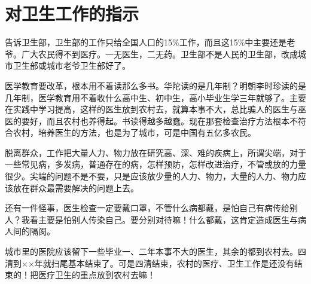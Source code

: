 \section[对卫生工作的指示（一九六五年六月二十六日）]{对卫生工作的指示}


告诉卫生部，卫生部的工作只给全国人口的15$\%$工作，而且这15$\%$中主要还是老爷。广大农民得不到医疗。一无医生，二无药。卫生部不是人民的卫生部，改成城市卫生部或城市老爷卫生部好了。

医学教育要改革，根本用不着读那么多书。华陀读的是几年制？明朝李时珍读的是几年制，医学教育用不着收什么高中生、初中生，高小毕业生学三年就够了。主要在实践中学习提高，这样的医生放到农村去，就算本事不大，总比骗人的医生与巫医的要好，而且农村也养得起。书读得越多越蠢。现在那套检查治疗方法根本不符合农村，培养医生的方法，也是为了城市，可是中国有五亿多农民。

脱离群众，工作把大量人力、物力放在研究高、深、难的疾病上，所谓尖端，对于一些常见病，多发病，普通存在的病，怎样预防，怎样改进治疗，不管或放的力量很少。尖端的问题不是不要，只是应该放少量的人力、物力，大量的人力、物力应该放在群众最需要解决的问题上去。

还有一件怪事，医生检查一定要戴口罩，不管什么病都戴，是怕自己有病传给别人？我看主要是怕别人传染自己。要分别对待嘛！什么都戴，这肯定造成医生与病人间的隔阂。

城市里的医院应该留下一些毕业一、二年本事不大的医生，其余的都到农村去。四清到××年就扫尾基本结束了。可是四清结束，农村的医疗、卫生工作是还没有结束的！把医疗卫生的重点放到农村去嘛！

